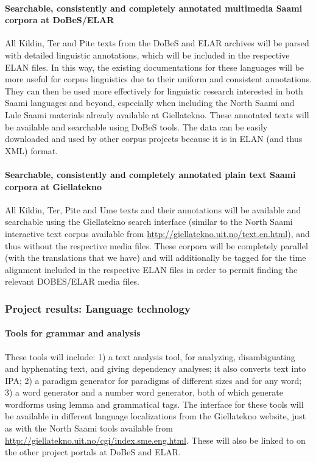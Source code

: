 \documentclass[a4paper,12pt]{article}
\begin{document}
\paragraph{Searchable, consistently and completely annotated multimedia Saami corpora at DoBeS/ELAR}
All Kildin, Ter and Pite texts from the DoBeS and ELAR archives will be parsed with detailed linguistic annotations, which will be included in the respective ELAN files. In this way, the existing documentations for these languages will be more useful for corpus linguistics due to their uniform and consistent annotations. They can then be used more effectively for linguistic research interested in both Saami languages and beyond, especially when including the North Saami and Lule Saami materials already available at Giellatekno. These annotated texts will be available and searchable using DoBeS tools. The data can be easily downloaded and used by other corpus projects because it is in ELAN (and thus XML) format.

\paragraph{Searchable, consistently and completely annotated plain text Saami corpora at Giellatekno}
All Kildin, Ter, Pite and Ume texts and their annotations will be available and searchable using the Giellatekno search interface (similar to the North Saami interactive text corpus available from \url{http://giellatekno.uit.no/text.en.html}), and thus without the respective media files. These corpora will be completely parallel (with the translations that we have) and will additionally be tagged for the time alignment included in the respective ELAN files in order to permit finding the relevant DOBES/ELAR media files.

\subsubsection{Project results: Language technology}\label{projectResult2}

\paragraph{Tools for grammar and analysis}
These tools will include: 1) a text analysis tool, for analyzing, disambiguating and hyphenating text, and giving dependency analyses; it also converts text into IPA; 2) a paradigm generator for paradigms of different sizes and for any word; 3) a word generator and a number word generator, both of which generate wordforms using lemma and grammatical tags. The interface for these tools will be available in different language localizations from the Giellatekno website, just as with the North Saami tools available from \url{http://giellatekno.uit.no/cgi/index.sme.eng.html}. These will also be linked to on the other project portals at DoBeS and ELAR.
\end{document}

